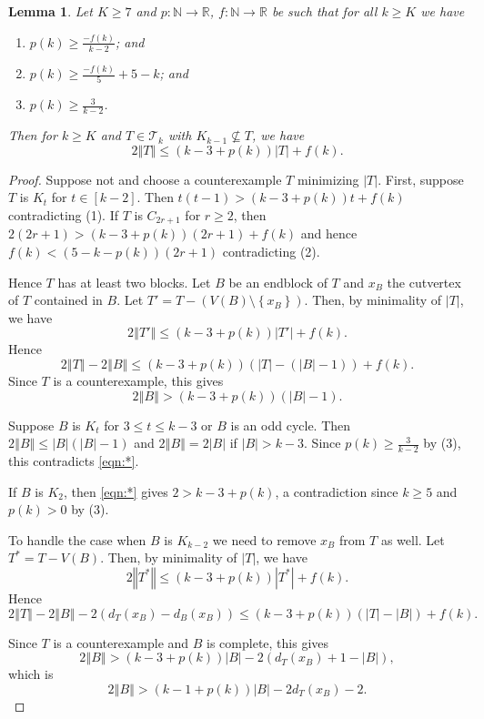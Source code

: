 \documentclass[12pt]{article}
\theoremstyle{plain}
\newtheorem{lem}[thm]{Lemma}
\theoremstyle{definition}
\theoremstyle{remark}
\newcommand{\fancy}[1]{\mathcal{#1}}
\newcommand{\IN}{\mathbb{N}}
\newcommand{\IR}{\mathbb{R}}
\newcommand{\T}{\fancy{T}}
\newcommand{\set}[1]{\left\{ #1 \right\}}
\newcommand{\card}[1]{\left|#1\right|}
\newcommand{\size}[1]{\left\Vert#1\right\Vert}
\newcommand{\func}[3]{#1\colon #2 \rightarrow #3}
\newcommand{\irange}[1]{\left[#1\right]}
\newcommand{\parens}[1]{\left( #1 \right)}
\begin{document}
\begin{lem}\label{BoundFamilyWithoutKKMinusOne}
	Let $K \ge 7$ and $\func{p}{\IN}{\IR}$, $\func{f}{\IN}{\IR}$ be such that for all $k \ge K$ we have
	\begin{enumerate}
		\item $p(k) \ge \frac{-f(k)}{k-2}$; and
		\item $p(k) \ge \frac{-f(k)}{5} + 5 - k$; and
		\item $p(k) \ge \frac{3}{k-2}$.
	\end{enumerate}
	Then for $k \ge K$ and $T \in \T_k$ with $K_{k-1} \not \subseteq T$, we have
	\[2\size{T} \le (k-3 + p(k))\card{T} + f(k).\]
\end{lem}
\begin{proof}
	Suppose not and choose a counterexample $T$ minimizing $|T|$.  First, suppose $T$ is $K_t$ for $t \in \irange{k-2}$.  Then $t(t-1) > (k-3 + p(k))t + f(k)$ contradicting (1).  If $T$ is $C_{2r+1}$ for $r \ge 2$, then $2(2r+1) > (k-3 + p(k))(2r+1) + f(k)$ and hence $f(k) < (5-k-p(k))(2r+1)$ contradicting (2).
	
	Hence $T$ has at least two blocks.  Let $B$ be an endblock of $T$ and $x_B$ the cutvertex of $T$ contained in $B$. Let $T' = T - \parens{V(B) \setminus \set{x_B}}$. Then, by minimality of $|T|$, we have
	\[2\size{T'} \le (k-3 + p(k))\card{T'} + f(k).\]
	Hence
	\[2\size{T} - 2\size{B} \le (k-3 + p(k))\parens{\card{T} - (\card{B} - 1)} + f(k).\]
	Since $T$ is a counterexample, this gives
	\begin{equation}
	2\size{B} > (k-3 + p(k))(\card{B} - 1).\tag{*}\label{eqn:*}
	\end{equation}
	
	Suppose $B$ is $K_t$ for $3 \le t \le k-3$ or $B$ is an odd cycle. Then $2\size{B} \le \card{B}(\card{B}-1)$ and $2\size{B} = 2\card{B}$ if $\card{B} > k-3$.  Since $p(k) \ge \frac{3}{k-2}$ by (3), this contradicts \ref{eqn:*}.
	
	If $B$ is $K_2$, then \ref{eqn:*} gives $2 > k-3 + p(k)$, a contradiction since $k \ge 5$ and $p(k) > 0$ by (3).
	
	To handle the case when $B$ is $K_{k-2}$ we need to remove $x_B$ from $T$ as well.  Let $T^* = T - V(B)$. Then, by minimality of $|T|$, we have
	\[2\size{T^*} \le (k-3 + p(k))\card{T^*} + f(k).\]
	Hence
	\[2\size{T} - 2\size{B} - 2(d_T(x_B) - d_B(x_B)) \le (k-3 + p(k))\parens{\card{T} - \card{B}} + f(k).\]
	
	Since $T$ is a counterexample and $B$ is complete, this gives
	\[2\size{B} > (k-3 + p(k))\card{B} -2(d_T(x_B) + 1 - \card{B}),\]
	which is
	\begin{equation}
	2\size{B} > (k-1 + p(k))\card{B} - 2d_T(x_B) - 2.\tag{**}\label{eqn:**}
	\end{equation}


\end{proof}
\end{document}
